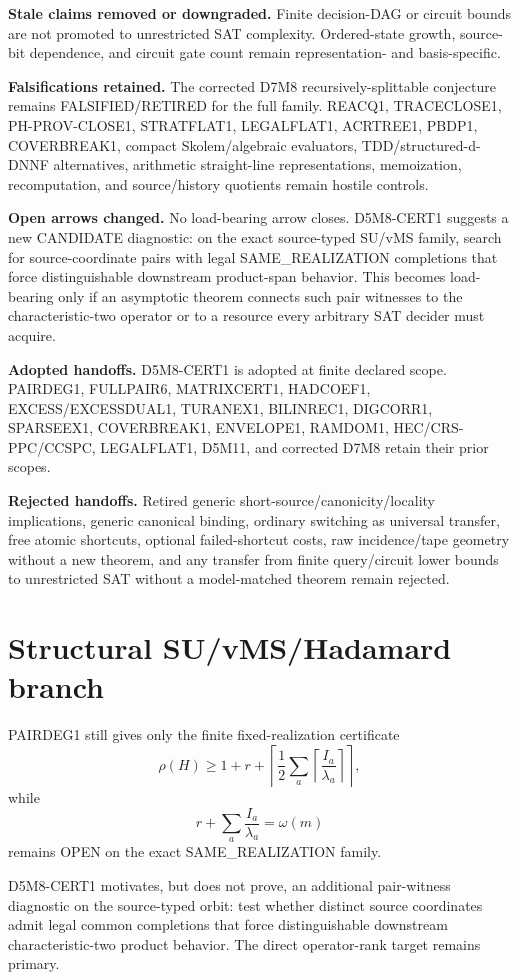 \documentclass[11pt]{article}
\begin{document}
\textbf{Stale claims removed or downgraded.}
Finite decision-DAG or circuit bounds are not promoted to unrestricted SAT complexity. Ordered-state growth, source-bit dependence, and circuit gate count remain representation- and basis-specific.

\textbf{Falsifications retained.}
The corrected D7M8 recursively-splittable conjecture remains FALSIFIED/RETIRED for the full family. REACQ1, TRACECLOSE1, PH-PROV-CLOSE1, STRATFLAT1, LEGALFLAT1, ACRTREE1, PBDP1, COVERBREAK1, compact Skolem/algebraic evaluators, TDD/structured-d-DNNF alternatives, arithmetic straight-line representations, memoization, recomputation, and source/history quotients remain hostile controls.

\textbf{Open arrows changed.}
No load-bearing arrow closes. D5M8-CERT1 suggests a new CANDIDATE diagnostic: on the exact source-typed SU/vMS family, search for source-coordinate pairs with legal SAME\_REALIZATION completions that force distinguishable downstream product-span behavior. This becomes load-bearing only if an asymptotic theorem connects such pair witnesses to the characteristic-two operator or to a resource every arbitrary SAT decider must acquire.

\textbf{Adopted handoffs.}
D5M8-CERT1 is adopted at finite declared scope. PAIRDEG1, FULLPAIR6, MATRIXCERT1, HADCOEF1, EXCESS/EXCESSDUAL1, TURANEX1, BILINREC1, DIGCORR1, SPARSEEX1, COVERBREAK1, ENVELOPE1, RAMDOM1, HEC/CRS-PPC/CCSPC, LEGALFLAT1, D5M11, and corrected D7M8 retain their prior scopes.

\textbf{Rejected handoffs.}
Retired generic short-source/canonicity/locality implications, generic canonical binding, ordinary switching as universal transfer, free atomic shortcuts, optional failed-shortcut costs, raw incidence/tape geometry without a new theorem, and any transfer from finite query/circuit lower bounds to unrestricted SAT without a model-matched theorem remain rejected.

\section*{Structural SU/vMS/Hadamard branch}
PAIRDEG1 still gives only the finite fixed-realization certificate
\[
\rho(H)\ge
1+r+
\left\lceil\frac12\sum_a
\left\lceil\frac{I_a}{\lambda_a}\right\rceil
\right\rceil,
\]
while
\[
r+\sum_a\frac{I_a}{\lambda_a}=\omega(m)
\]
remains OPEN on the exact SAME\_REALIZATION family.

D5M8-CERT1 motivates, but does not prove, an additional pair-witness diagnostic on the source-typed orbit: test whether distinct source coordinates admit legal common completions that force distinguishable downstream characteristic-two product behavior. The direct operator-rank target remains primary.
\end{document}
